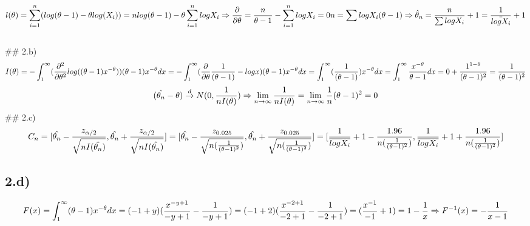 \documentclass[
]{article}
\begin{document}
\[l(\theta )=\sum_{i=1}^{n}(log(\theta -1)-\theta log(X_{i})) \\
= nlog(\theta -1) - \theta \sum_{i=1}^{n}logX_{i} \\
\Rightarrow \frac{\partial }{\partial \theta } = \frac{n}{\theta -1}-\sum_{i=1}^{n}logX_{i} = 0 \\
n = \sum log X_{i} (\theta -1) \\
\Rightarrow \hat\theta_{n} = \frac{n}{\sum log X_{i}} + 1 \\
= \frac{1}{\bar{log X_{i}}} + 1 \\\]\\
\#\# 2.b)\\
\[I(\theta ) = -\int_{1}^{\infty }(\frac{\partial^2 }{\partial \theta ^2}log((\theta -1)x^{-\theta } ))(\theta -1)x^{-\theta }dx \\
= -\int_{1}^{\infty }(\frac{\partial }{\partial \theta }\frac{1}{(\theta -1)}-logx)(\theta -1)x^{-\theta }dx \\
= \int_{1}^{\infty }(\frac{1}{(\theta -1)})x^{-\theta }dx \\
=\int_{1}^{\infty }\frac{x^{-\theta }}{\theta -1}dx \\
=0 + \frac{1^{1-\theta }}{(\theta -1)^{2}} \\
=\frac{1}{(\theta -1)^{2}} \\\\\]\[
(\hat{\theta _{n}}-\theta ) \overset{d}{\rightarrow} N(0,\frac{1}{nI(\theta )}) \\
\Rightarrow \lim_{n\rightarrow \infty }\frac{1}{nI(\theta )} = \lim_{n\rightarrow \infty }\frac{1}{n}(\theta -1)^{2} = 0 \\
\] \#\# 2.c)\\
\[C_{n} = [\hat{\theta _{n}}-\frac{z_{\alpha /2}}{\sqrt{nI(\hat{\theta _{n}})}}, \hat{\theta _{n}}+\frac{z_{\alpha /2}}{\sqrt{nI(\hat{\theta _{n}})}} ]\\
= [\hat{\theta _{n}}-\frac{z_{0.025}}{\sqrt{n(\frac{1}{(\theta -1)^{2}})}}, \hat{\theta _{n}}+\frac{z_{0.025}}{\sqrt{n(\frac{1}{(\theta -1)^{2}})}} ]\\
=[\frac{1}{\overline{logX_{i}}} + 1 - \frac{1.96}{n(\frac{1}{(\theta -1)^{2}})},\frac{1}{\overline{logX_{i}}} + 1 + \frac{1.96}{n(\frac{1}{(\theta -1)^{2}})}] \\\]

\hypertarget{d}{%
\subsection{2.d)}\label{d}}
\begin{equation} 
F(x) = \int_{1}^{\infty }(\theta -1)x^{-\theta }dx \\
= (-1 +y)(\frac{x^{-y+1}}{-y+1}-\frac{1}{-y+1}) \\
= (-1 +2 )(\frac{x^{-2 +1}}{-2 +1}-\frac{1}{-2 +1}) \\
= (\frac{x^{-1}}{-1} + 1) \\
= 1 - \frac{1}{x} \\
\Rightarrow F^{-1}(x) = -\frac{1}{x-1} \\
\end{equation}
\end{document}
